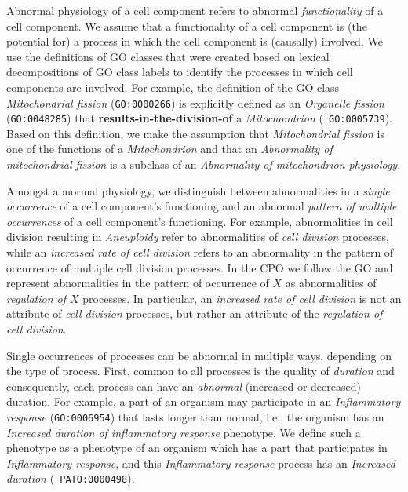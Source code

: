 \documentclass[12pt]{article}
\renewcommand{\cite}{\citep}
\begin{document}
Abnormal physiology of a cell component refers to abnormal {\em
  functionality} of a cell component. We assume that a functionality
of a cell component is (the potential for) a process in which the cell
component is (causally) involved. We use the definitions of GO classes
that were created based on lexical decompositions of GO class labels
\cite{Mungall2010go, Bada2007a, Ogren2004} to identify the processes
in which cell components are involved. For example, the definition of
the GO class {\em Mitochondrial fission} ({\tt GO:0000266}) is
explicitly defined as an {\em Organelle fission} ({\tt GO:0048285})
that {\bf results-in-the-division-of} a {\em Mitochondrion} ({\tt
  GO:0005739}). Based on this definition, we make the assumption that
{\em Mitochondrial fission} is one of the functions of a {\em
  Mitochondrion} and that an {\em Abnormality of mitochondrial
  fission} is a subclass of an {\em Abnormality of mitochondrion
  physiology}.

Amongst abnormal physiology, we distinguish between abnormalities in a
{\em single occurrence} of a cell component's functioning and an
abnormal {\em pattern of multiple occurrences} of a cell component's
functioning. For example, abnormalities in cell division resulting in
{\em Aneuploidy} refer to abnormalities of {\em cell division}
processes, while an {\em increased rate of cell division} refers to an
abnormality in the pattern of occurrence of multiple cell division
processes. In the CPO we follow the GO and represent abnormalities in
the pattern of occurrence of $X$ as abnormalities of {\em regulation
  of $X$} processes. In particular, an {\em increased rate of cell
  division} is not an attribute of {\em cell division} processes, but
rather an attribute of the {\em regulation of cell division}.

Single occurrences of processes can be abnormal in multiple ways,
depending on the type of process.
%
First, common to all processes is the quality of {\em duration} and
consequently, each process can have an {\em abnormal} (increased or
decreased) duration. For example, a part of an organism may
participate in an {\em Inflammatory response} ({\tt GO:0006954}) that
lasts longer than normal, i.e., the organism has an {\em Increased
  duration of inflammatory response} phenotype. We define such a
phenotype as a phenotype of an organism which has a part that
participates in {\em Inflammatory response}, and this {\em
  Inflammatory response} process has an {\em Increased duration} ({\tt
  PATO:0000498}).
\end{document}
